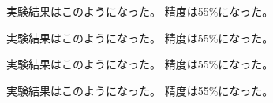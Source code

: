 実験結果はこのようになった。%
精度は55\%になった。

実験結果はこのようになった。%
精度は55\%になった。

実験結果はこのようになった。%
精度は55\%になった。

実験結果はこのようになった。%
精度は55\%になった。